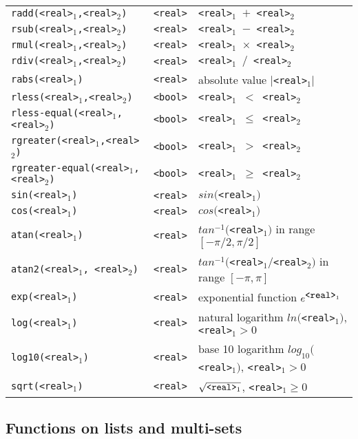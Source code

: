 \begin{tabular}{|l|l|p{8cm}|}
 {\tt radd(<real>$_1$,<real>$_2$)}	& {\tt  <real>}  & {\tt <real>$_1$ $+$ <real>$_2$} \\ 
 {\tt rsub(<real>$_1$,<real>$_2$)}	& {\tt  <real>} & {\tt <real>$_1$ $-$ <real>$_2$} \\ 
 {\tt rmul(<real>$_1$,<real>$_2$)}	& {\tt  <real>} & {\tt <real>$_1$ $\times$ <real>$_2$} \\ 
 {\tt rdiv(<real>$_1$,<real>$_2$)}	& {\tt  <real>} & {\tt <real>$_1$ $/$ <real>$_2$} \\
 {\tt rabs(<real>$_1$)}			& {\tt  <real>}  & absolute value $|${\tt <real>}$_1 |$ \\
 {\tt rless(<real>$_1$,<real>$_2$)}	& {\tt  <bool>} & {\tt <real>$_1$ $<$ <real>$_2$} \\ 
 {\tt rless-equal(<real>$_1$,<real>$_2$)}& {\tt  <bool>} & {\tt <real>$_1$ $\leq$ <real>$_2$} \\ 
 {\tt rgreater(<real>$_1$,<real>$_2$)}	& {\tt  <bool>} & {\tt <real>$_1$ $>$ <real>$_2$} \\ 
 {\tt rgreater-equal(<real>$_1$,<real>$_2$)}& {\tt  <bool>} & {\tt <real>$_1$ $\geq$ <real>$_2$} \\ \hline
 {\tt sin(<real>$_1$)}			& {\tt  <real>}  & $sin(${\tt <real>}$_1)$ \\ 
 {\tt cos(<real>$_1$)}			& {\tt  <real>}  & $cos(${\tt <real>}$_1)$ \\ 
 {\tt atan(<real>$_1$)}			& {\tt  <real>}  & $tan^{-1}(${\tt <real>}$_1)$ in range $[-\pi/2, \pi/2]$ \\ 
 {\tt atan2(<real>$_1$, <real>$_2$)}	& {\tt  <real>}  & $tan^{-1}(${\tt <real>}$_1 / ${\tt <real>}$_2 )$ in range $[-\pi, \pi]$ \\ 
 {\tt exp(<real>$_1$)}			& {\tt  <real>}  & exponential function $e^{\mbox{{\tt <real>}}_1}$ \\ 
 {\tt log(<real>$_1$)}			& {\tt  <real>}  & natural logarithm $ln(${\tt <real>}$_1)$, 
						           {\tt <real>}$_1 > 0$  \\ 
 {\tt log10(<real>$_1$)}		& {\tt  <real>}  &  base 10 logarithm $log_{10}(${\tt <real>}$_1)$,
						           {\tt <real>}$_1 > 0$  \\ 
 {\tt sqrt(<real>$_1$)}			& {\tt  <real>}  & $\sqrt{\mbox{{\tt <real>}$_1$}}$,
						           {\tt <real>}$_1 \geq 0$  \\ \hline
\end{tabular}

\newpage

\subsection{Functions on lists and multi-sets}

